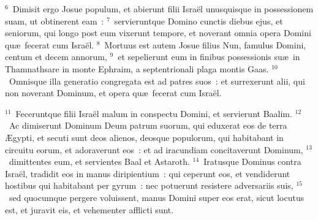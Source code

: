 ${}^{6}$~Dimisit ergo Josue populum, et abierunt filii Isra\"el unusquisque in possessionem suam, ut obtinerent eam~:
${}^{7}$~servieruntque Domino cunctis diebus ejus, et seniorum, qui longo post eum vixerunt tempore, et noverant omnia opera Domini qu\ae\ fecerat cum Isra\"el.
${}^{8}$~Mortuus est autem Josue filius Nun, famulus Domini, centum et decem annorum,
${}^{9}$~et sepelierunt eum in finibus possessionis su\ae\ in Thamnathsare in monte Ephraim, a septentrionali plaga montis Gaas.
${}^{10}$~Omnisque illa generatio congregata est ad patres suos~: et surrexerunt alii, qui non noverant Dominum, et opera qu\ae\ fecerat cum Isra\"el.


${}^{11}$~Feceruntque filii Isra\"el malum in conspectu Domini, et servierunt Baalim.
${}^{12}$~Ac dimiserunt Dominum Deum patrum suorum, qui eduxerat eos de terra \AE gypti, et secuti sunt deos alienos, deosque populorum, qui habitabant in circuitu eorum, et adoraverunt eos~: et ad iracundiam concitaverunt Dominum,
${}^{13}$~dimittentes eum, et servientes Baal et Astaroth.
${}^{14}$~Iratusque Dominus contra Isra\"el, tradidit eos in manus diripientium~: qui ceperunt eos, et vendiderunt hostibus qui habitabant per gyrum~: nec potuerunt resistere adversariis suis,
${}^{15}$~sed quocumque pergere voluissent, manus Domini super eos erat, sicut locutus est, et juravit eis, et vehementer afflicti sunt.


